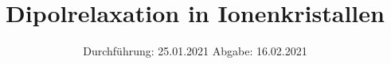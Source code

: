

\subject{V 48}
\title{Dipolrelaxation in Ionenkristallen}
\date{%
  Durchführung: 25.01.2021
  \hspace{3em}
  Abgabe: 16.02.2021
}



\maketitle
\thispagestyle{empty}
\tableofcontents
\newpage






\printbibliography{}


